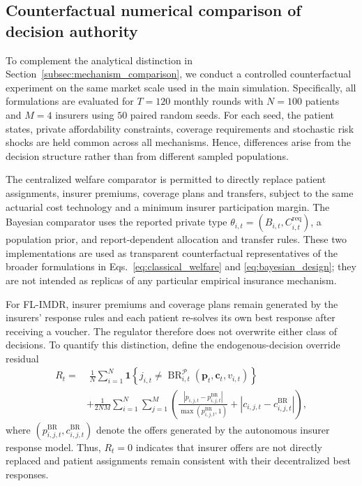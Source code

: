 \subsection{Counterfactual numerical comparison of decision authority}
\label{app:mechanism_numerical}

To complement the analytical distinction in
Section~\ref{subsec:mechanism_comparison}, we conduct a controlled
counterfactual experiment on the same market scale used in the main
simulation. Specifically, all formulations are evaluated for \(T=120\)
monthly rounds with \(N=100\) patients and \(M=4\) insurers using \(50\)
paired random seeds. For each seed, the patient states, private affordability
constraints, coverage requirements and stochastic risk shocks are held common
across all mechanisms. Hence, differences arise from the decision structure
rather than from different sampled populations.

The centralized welfare comparator is permitted to directly replace patient
assignments, insurer premiums, coverage plans and transfers, subject to the
same actuarial cost technology and a minimum insurer participation margin.
The Bayesian comparator uses the reported private type
\(\theta_{i,t}=(B_{i,t},C^{\mathrm{req}}_{i,t})\), a population prior, and
report-dependent allocation and transfer rules. These two implementations are
used as transparent counterfactual representatives of the broader formulations
in Eqs.~\eqref{eq:classical_welfare} and \eqref{eq:bayesian_design}; they are
not intended as replicas of any particular empirical insurance mechanism.

For FL-IMDR, insurer premiums and coverage plans remain generated by the
insurers' response rules and each patient re-solves its own best response after
receiving a voucher. The regulator therefore does not overwrite either class
of decisions. To quantify this distinction, define the endogenous-decision
override residual
\begin{equation}
\begin{aligned}
R_t
=&\;
\frac{1}{N}\sum_{i=1}^{N}
\mathbf 1\!\left\{
j_{i,t}\neq
\operatorname{BR}_{i,t}^{\mathcal P}
(\mathbf p_t,\mathbf c_t,v_{i,t})
\right\}\\
&+\frac{1}{2NM}\sum_{i=1}^{N}\sum_{j=1}^{M}
\left(
\frac{|p_{i,j,t}-p_{i,j,t}^{\mathrm{BR}}|}
{\max(p_{i,j,t}^{\mathrm{BR}},1)}
+
|c_{i,j,t}-c_{i,j,t}^{\mathrm{BR}}|
\right),
\end{aligned}
\label{eq:override_residual}
\end{equation}
where \((p_{i,j,t}^{\mathrm{BR}},c_{i,j,t}^{\mathrm{BR}})\) denote the
offers generated by the autonomous insurer response model. Thus,
\(R_t=0\) indicates that insurer offers are not directly replaced and patient
assignments remain consistent with their decentralized best responses.

